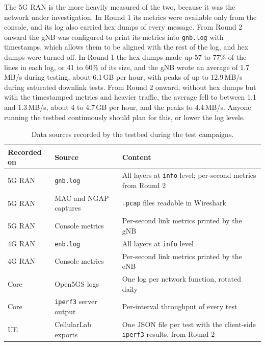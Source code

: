 The 5G \gls{RAN} is the more heavily measured of the two, because it was the network under investigation. In Round 1 its metrics were available only from the console, and its log also carried hex dumps of every message. From Round 2 onward the \gls{gNB} was configured to print its metrics into \texttt{gnb.log} with timestamps, which allows them to be aligned with the rest of the log, and hex dumps were turned off.
In Round 1 the hex dumps made up 57 to 77\% of the lines in each log, or 41 to 60\% of its size, and the \gls{gNB} wrote an average of 1.7\,MB/s during testing, about 6.1\,GB per hour, with peaks of up to 12.9\,MB/s during saturated downlink tests. From Round 2 onward, without hex dumps but with the timestamped metrics and heavier traffic, the average fell to between 1.1 and 1.3\,MB/s, about 4 to 4.7\,GB per hour, and the peaks to 4.4\,MB/s. Anyone running the testbed continuously should plan for this, or lower the log levels.

\begin{table}[htbp]
    \centering
    \begin{tabular}{|l|l|p{6.2cm}|}
        \hline
        \textbf{Recorded on} & \textbf{Source} & \textbf{Content} \\
        \hline
        5G \gls{RAN} & \texttt{gnb.log} & All layers at \texttt{info} level; per-second metrics from Round 2 \\
        \hline
        5G \gls{RAN} & \gls{MAC} and \gls{NGAP} captures & \texttt{.pcap} files readable in Wireshark \\
        \hline
        5G \gls{RAN} & Console metrics & Per-second link metrics printed by the \gls{gNB} \\
        \hline
        4G \gls{RAN} & \texttt{enb.log} & All layers at \texttt{info} level \\
        \hline
        4G \gls{RAN} & Console metrics & Per-second link metrics printed by the \gls{eNB} \\
        \hline
        Core & Open5GS logs & One log per network function, rotated daily \\
        \hline
        Core & \texttt{iperf3} server output & Per-interval throughput of every test \\
        \hline
        \gls{UE} & CellularLab exports & One JSON file per test with the client-side \texttt{iperf3} results, from Round 2 \\
        \hline
    \end{tabular}
    \caption{Data sources recorded by the testbed during the test campaigns.}
    \label{tab:data-sources}
\end{table}

